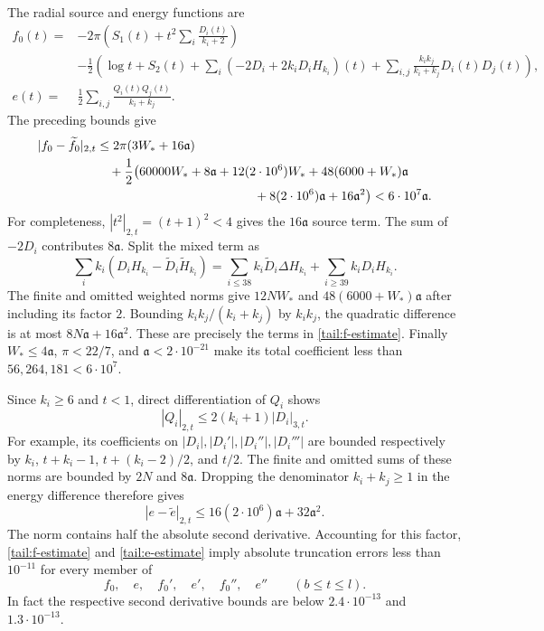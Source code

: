 The radial source and energy functions are
\begin{align*}
 f_0(t)={}&-2\pi\left(S_1(t)+t^2\sum_i\frac{D_i(t)}{k_i+2}\right)\\
 &-\frac12\left(\log t+S_2(t)
 +\sum_i(-2D_i+2k_iD_iH_{k_i})(t)
 +\sum_{i,j}\frac{k_ik_j}{k_i+k_j}D_i(t)D_j(t)\right),\\
 e(t)={}&\frac12\sum_{i,j}\frac{Q_i(t)Q_j(t)}{k_i+k_j}.
\end{align*}
The preceding bounds give
\begin{align}
 |f_0-\widetilde f_0|_{2,t}
 &\leq2\pi(3W_*+16\mathfrak a)\notag\\
 &\quad+\frac12\bigl(60000W_*+8\mathfrak a
       +12(2\cdot10^6)W_*
       +48(6000+W_*)\mathfrak a\notag\\
 &\hspace{44mm}+8(2\cdot10^6)\mathfrak a
       +16\mathfrak a^2\bigr)
 <6\cdot10^7\mathfrak a.
 \label{tail:f-estimate}
\end{align}
For completeness, $|t^2|_{2,t}=(t+1)^2<4$ gives the $16\mathfrak a$ source
term.  The sum of $-2D_i$ contributes $8\mathfrak a$.  Split the mixed term as
\[
 \sum_i k_i(D_iH_{k_i}-\widetilde D_i\widetilde H_{k_i})
 =\sum_{i\leq38}k_i\widetilde D_i\Delta H_{k_i}
    +\sum_{i\geq39}k_iD_iH_{k_i}.
\]
The finite and omitted weighted norms give $12NW_*$ and
$48(6000+W_*)\mathfrak a$ after including its factor $2$.
Bounding $k_ik_j/(k_i+k_j)$ by $k_ik_j$, the quadratic difference
is at most $8N\mathfrak a+16\mathfrak a^2$.  These are precisely the terms in
\eqref{tail:f-estimate}.  Finally $W_*\leq4\mathfrak a$, $\pi<22/7$, and
$\mathfrak a<2\cdot10^{-21}$ make its total coefficient less than
$56,264,181<6\cdot10^7$.

Since $k_i\geq6$ and $t<1$, direct differentiation of $Q_i$ shows
\[
 |Q_i|_{2,t}\leq2(k_i+1)|D_i|_{3,t}.
\]
For example, its coefficients on
$|D_i|,|D_i'|,|D_i''|,|D_i'''|$ are bounded respectively by
$k_i$, $t+k_i-1$, $t+(k_i-2)/2$, and $t/2$.
The finite and omitted sums of these norms are bounded by $2N$
and $8\mathfrak a$.  Dropping the denominator $k_i+k_j\geq1$ in the energy
difference therefore gives
\begin{equation}
 |e-\widetilde e|_{2,t}
 \leq16(2\cdot10^6)\mathfrak a+32\mathfrak a^2.
 \label{tail:e-estimate}
\end{equation}
The norm contains half the absolute second derivative.  Accounting
for this factor, \eqref{tail:f-estimate} and
\eqref{tail:e-estimate} imply absolute truncation errors less than
$10^{-11}$ for every member of
\begin{equation}
 f_0,\quad e,\quad f_0',\quad e',\quad f_0'',\quad e''
 \qquad (b\leq t\leq l).
 \label{tail:uniform-error}
\end{equation}
In fact the respective second derivative bounds are below
$2.4\cdot10^{-13}$ and $1.3\cdot10^{-13}$.

